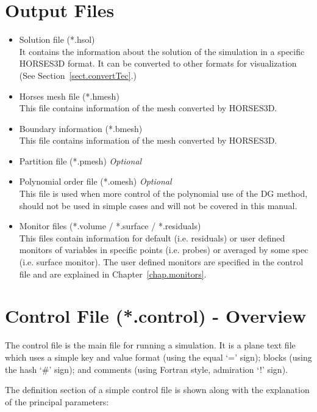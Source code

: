 \documentclass[a4paper,10pt]{report}
\begin{document}
\section{Output Files}
\begin{itemize}
\item Solution file (*.hsol) \\
	It contains the information about the solution of the simulation in a specific HORSES3D format. It can be converted to other formats for visualization (See Section~\ref{sect.convertTec}.)
\item Horses mesh file (*.hmesh) \\
This file contains information of the mesh converted by HORSES3D.
\item Boundary information (*.bmesh) \\
This file contains information of the mesh converted by HORSES3D.
\item Partition file (*.pmesh) \emph{Optional} \\
\item Polynomial order file (*.omesh) \emph{Optional} \\
This file is used when more control of the polynomial use of the DG method, should not be used in simple cases and will not be covered in this manual.
\item Monitor files (*.volume / *.surface / *.residuals) \\
	This files contain information for default (i.e. residuals) or user defined monitors of variables in specific points (i.e. probes) or averaged by some spec (i.e. surface monitor). The user defined monitors are specified in the control file and are explained in Chapter~\ref{chap.monitors}.
\end{itemize}

\section{Control File (*.control) - Overview}\label{sect.control}

The control file is the main file for running a simulation. It is a plane text file which uses a simple key and value format (using the equal `=’ sign); blocks (using the hash `\#’ sign); and comments (using Fortran style, admiration `!’ sign).

The definition section of a simple control file is shown along with the explanation of the principal parameters:
\end{document}
